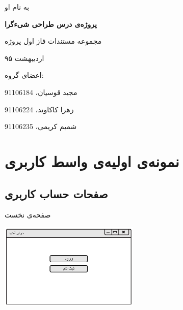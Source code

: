 \documentclass{article}
\begin{document}
	\begin{titlepage}
	\centering
	
		{\Large به نام او  \par}
		\vspace{2cm}
		
		{\Huge \bfseries پروژه‌ی درس طراحی شیءگرا \par}
		\vspace{3cm}

		{\LARGE  مجموعه مستندات فاز اول پروژه \par}
		\vspace{0.3cm}

		{\LARGE اردیبهشت ۹۵ \par}
		\vspace{4cm}

		
		{\Large اعضای گروه: \par}
		\vspace{0.5cm}

		{\Large مجید قوسیان، 91106184 \par}
		\vspace{0.1cm}

		{\Large زهرا کاکاوند، 91106224 \par}
	\vspace{0.1cm}

{\Large شمیم کریمی، 91106235 \par}
		
\end{titlepage}

\tableofcontents


\newpage
\section{نمونه‌ی اولیه‌ی واسط کاربری}

\subsection{صفحات حساب کاربری}

\vspace{1cm}
صفحه‌ی نخست
\begin{center}
\includegraphics[width=0.5\textwidth]{Prototype/Accounting/HomePage.png}
\end{center}
\end{document}
